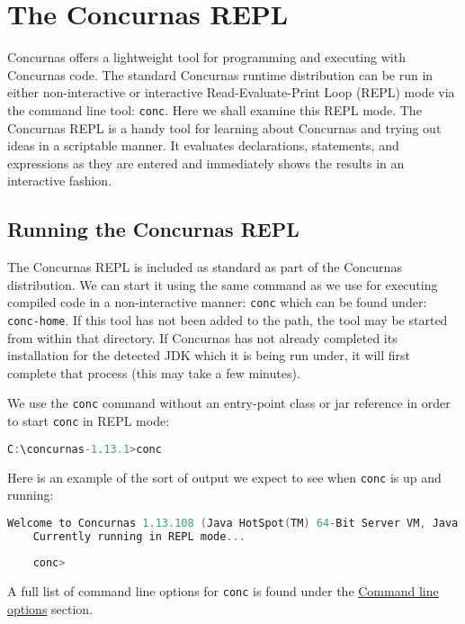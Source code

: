 \documentclass[conc-doc]{subfiles}
\begin{document}
	\chapter[The Concurnas REPL]{The Concurnas REPL}
	\label{ch:repl}
	
	Concurnas offers a lightweight tool for programming and executing with Concurnas code. The standard Concurnas runtime distribution can be run in either non-interactive or interactive Read-Evaluate-Print Loop (REPL) mode via the command line tool: \lstinline{conc}. Here we shall examine this REPL mode. The Concurnas REPL is a handy tool for learning about Concurnas and trying out ideas in a scriptable manner. It evaluates declarations, statements, and expressions as they are entered and immediately shows the results in an interactive fashion.	
	
	\section{Running the Concurnas REPL}
	The Concurnas REPL is included as standard as part of the Concurnas distribution. We can start it using the same command as we use for executing compiled code in a non-interactive manner: \lstinline{conc} which can be found under: \lstinline{conc-home}. If this tool has not been added to the path, the tool may be started from within that directory. If Concurnas has not already completed its installation for the detected JDK which it is being run under, it will first complete that process (this may take a few minutes).
	
	We use the \lstinline{conc} command without an entry-point class or jar reference in order to start \lstinline{conc} in REPL mode:
	
	\begin{lstlisting}[language=C]
	C:\concurnas-1.13.1>conc
	\end{lstlisting}
	
	Here is an example of the sort of output we expect to see when \lstinline{conc} is up and running:
	
	\begin{lstlisting}[language=C]
	Welcome to Concurnas 1.13.108 (Java HotSpot(TM) 64-Bit Server VM, Java 11.0.5).
	Currently running in REPL mode...
	
	conc> 
	\end{lstlisting}
	
	A full list of command line options for \lstinline{conc} is found under the \hyperref[sec:cmdlineparams]{Command line options} section.
	
\end{document}
